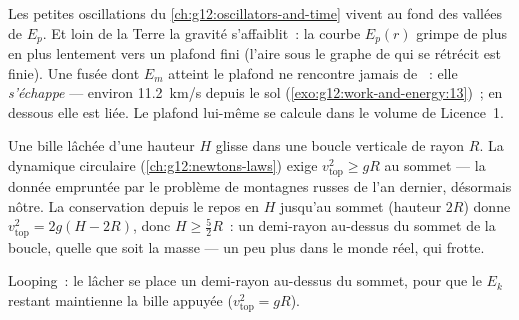 \begin{remark}\label{rem:g12:work-and-energy:escape}
Les petites oscillations du \cref{ch:g12:oscillators-and-time} vivent
au fond des vallées de $E_p$. Et loin de la Terre la gravité
s'affaiblit~: la courbe $E_p(r)$ grimpe de plus en plus lentement
vers un plafond fini (l'aire sous le graphe de  qui se rétrécit
est finie). Une fusée dont $E_m$ atteint le plafond ne rencontre
jamais de ~: elle
\emph{s'échappe} --- environ
\qty{11.2}{km/s} depuis le sol (\cref{exo:g12:work-and-energy:13})~;
en dessous elle est liée. Le plafond lui-même se calcule dans le
volume de Licence~1.
\end{remark}

\begin{example}[Looping]\label{ex:g12:work-and-energy:loop}
Une bille lâchée d'une hauteur $H$ glisse dans une boucle verticale
de rayon $R$. La dynamique circulaire (\cref{ch:g12:newtons-laws})
exige $v_{\text{top}}^2 \geq gR$ au sommet --- la donnée empruntée
par le problème de montagnes russes de l'an dernier, désormais
nôtre. La conservation depuis le repos en $H$ jusqu'au sommet
(hauteur $2R$) donne $v_{\text{top}}^2 = 2g(H - 2R)$, donc
$H \geq \tfrac52 R$~: un demi-rayon au-dessus du sommet de la boucle,
quelle que soit la masse --- un peu plus dans le monde réel, qui
frotte.
\end{example}

\begin{omfigure}

{\small Looping~: le lâcher se place un demi-rayon au-dessus du
sommet, pour que le $E_k$ restant maintienne la bille appuyée
($v_{\text{top}}^2 = gR$).}
\end{omfigure}

